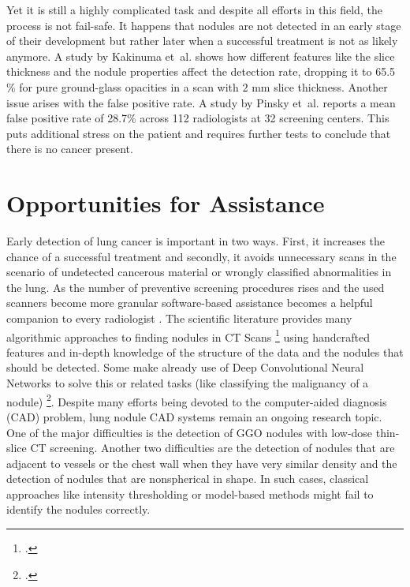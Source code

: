 \documentclass[main.tex]{subfiles}
\begin{document}
Yet it is still a highly complicated task and despite all efforts in this field, the process is not fail-safe. It happens that nodules are not detected in an early stage of their development but rather later when a successful treatment is not as likely anymore. A study by Kakinuma et~al.\cite{kakinuma2012comparison} shows how different features like the slice thickness and the nodule properties affect the detection rate, dropping it to 65.5$\%$ for pure ground-glass opacities in a scan with $2$ mm slice thickness. Another issue arises with the false positive rate. A study by Pinsky et~al.\cite{pinsky2013national} reports a mean false positive rate of 28.7$\%$ across 112 radiologists at 32 screening centers. This puts additional stress on the patient and requires further tests to conclude that there is no cancer present.


\section{Opportunities for Assistance}

Early detection of lung cancer is important in two ways. First, it increases the chance of a successful treatment and secondly, it avoids unnecessary scans in the scenario of undetected cancerous material or wrongly classified abnormalities in the lung. As the number of preventive screening procedures rises and the used scanners become more granular software-based assistance becomes a helpful companion to every radiologist \cite{li2005computer}. The scientific literature provides many algorithmic approaches to finding nodules in CT Scans \footcite{armato1999computerized,armato2001automated,okada2005robust,tao2009multi,
ye2009shape} using handcrafted features and in-depth knowledge of the structure of the data and the nodules that should be detected. Some make already use of Deep Convolutional Neural Networks to solve this or related tasks (like classifying the malignancy of a nodule) \footcite{cheng2016computer,huang2017lung,shen2015multi}. Despite many efforts being devoted to the computer-aided diagnosis (CAD) problem, lung nodule CAD systems remain an ongoing research topic. One of the major difficulties is the detection of GGO nodules with low-dose thin-slice CT screening. Another two difficulties are the detection of nodules that are adjacent to vessels or the chest wall when they have very similar density and the detection of nodules that are nonspherical in shape. In such cases, classical approaches like intensity thresholding or model-based methods might fail to identify the nodules correctly.
\end{document}
